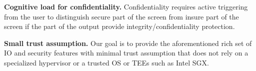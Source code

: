 \begin{mylist}
  \item \textbf{Cognitive load for confidentiality.} Confidentiality requires active triggering from the user to distinguish secure part of the screen from insure part of the screen if the part of the output provide integrity/confidentiality protection.
  
  
  \item  \textbf{Small trust assumption.} Our goal is to provide the aforementioned rich set of IO and security features with minimal trust assumption that does not rely on a specialized hypervisor or a trusted OS  or TEEs such as Intel SGX. %

\end{mylist}

